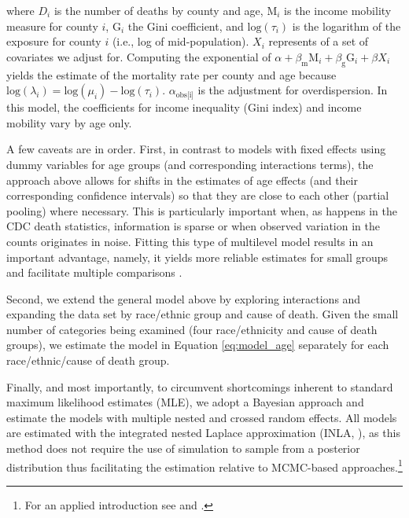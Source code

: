 \documentclass[11pt]{article}
\begin{document}
\noindent where $D_i$ is the number of deaths by county and age, $\text{M}_i$ is the income mobility measure for county $i$, $\text{G}_i$ the Gini coefficient, and $\text{log}(\tau_i)$ is the logarithm of the exposure for county $i$ (i.e., log of mid-population). $X_i$ represents of a set of covariates we adjust for. Computing the exponential of $\alpha + \beta_{\text{m}} \text{M}_i + \beta_{\text{g}} \text{G}_i + \beta X_i$ yields the estimate of the mortality rate per county and age because $\text{log}(\lambda_i) = \text{log}(\mu_i) - \text{log}(\tau_i)$. $\alpha_{\text{obs[i]}}$ is the adjustment for overdispersion. In this model, the coefficients for income inequality (Gini index) and income mobility vary by age only. 

A few caveats are in order. First, in contrast to models with fixed effects using dummy variables for age groups (and corresponding interactions terms), the approach above allows for shifts in the estimates of age effects (and their corresponding confidence intervals) so that they are close to each other (partial pooling) where necessary. This is particularly important when, as happens in the CDC death statistics, information is sparse or when observed variation in the counts originates in noise. Fitting this type of multilevel model results in an important advantage, namely, it yields more reliable estimates for small groups and facilitate multiple comparisons \citep{Gelman2012, Hill2013}. 

Second, we extend the general model above by exploring interactions and expanding the data set by race/ethnic group and cause of death. Given the small number of categories being examined (four race/ethnicity and cause of death groups), we estimate  the model in Equation \ref{eq:model_age} separately for each race/ethnic/cause of death group. 

Finally, and most importantly, to circumvent shortcomings inherent to standard maximum likelihood estimates (MLE), we adopt a Bayesian approach and estimate the models with multiple nested and crossed random effects. All models are estimated with the integrated nested Laplace approximation (INLA, \citealt{Rue2009}), as this method does not require the use of simulation to sample from a posterior distribution thus facilitating the estimation relative to MCMC-based approaches.\footnote{For an applied introduction see \cite{Blangiardo2015, Wang2018} and \cite{Zuur2017}.}
\end{document}
